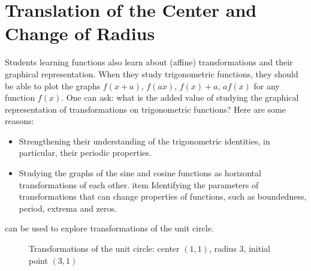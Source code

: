 
\chapter{Translation of the Center and Change of Radius}\label{ch.translated}


Students learning functions also learn about (affine) transformations and their graphical representation.
When they study trigonometric functions, they should be able to plot the graphs $f(x + a)$, $f(ax)$, $f(x)+a$, $af(x)$ for any function $f(x)$.
One can ask: what is the added value of studying the graphical representation of transformations on trigonometric functions?
Here are some reasons:
\begin{itemize}
\item Strengthening their understanding of the trigonometric identities, in particular, their periodic properties.
\item Studying the graphs of the sine and cosine functions as horizontal transformations of each other.
item Identifying the parameters of transformations that can change properties of functions, such as boundedness, period, extrema and zeros.
\end{itemize}

 can be used to explore transformations of the unit circle.

\begin{wrapfigure}[20]{r}{.5\textwidth}
\begin{center}
\vspace{-4ex}
\caption{Transformations of the unit circle: center $(1,1)$, radius $3$, initial point $(3,1)$}\label{fig.transformations-of-the-unit-circle}
\end{center}
\end{wrapfigure}

